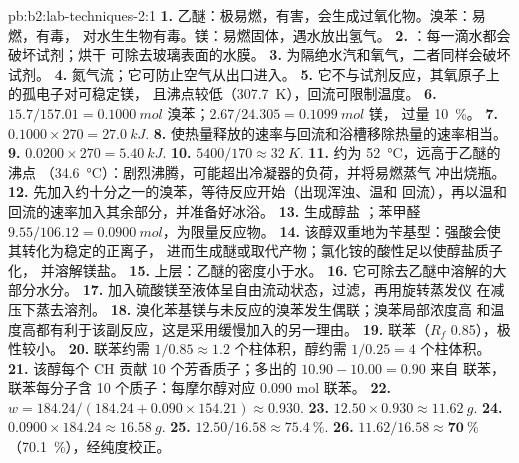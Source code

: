 \begin{solution}{pb:b2:lab-techniques-2:1}
\textbf{1.} 乙醚：极易燃，有害，会生成过氧化物。溴苯：易燃，有毒，
对水生生物有毒。镁：易燃固体，遇水放出氢气。
\textbf{2.} ：每一滴水都会破坏试剂；烘干
可除去玻璃表面的水膜。
\textbf{3.} 为隔绝水汽和氧气，二者同样会破坏试剂。
\textbf{4.} 氮气流；它可防止空气从出口进入。
\textbf{5.} 它不与试剂反应，其氧原子上的孤电子对可稳定镁，
且沸点较低（\qty{307.7}{K}），回流可限制温度。
\textbf{6.} $15.7/157.01 = \qty{0.1000}{mol}$ 溴苯；$2.67/24.305 = \qty{0.1099}{mol}$ 镁，
过量 10~\%。
\textbf{7.} $0.1000 \times 270 = \qty{27.0}{kJ}$.
\textbf{8.} 使热量释放的速率与回流和浴槽移除热量的速率相当。
\textbf{9.} $0.0200 \times 270 = \qty{5.40}{kJ}$.
\textbf{10.} $5400/170 \approx \qty{32}{K}$.
\textbf{11.} 约为 \qty{52}{\degreeCelsius}，远高于乙醚的沸点
（\qty{34.6}{\degreeCelsius}）：剧烈沸腾，可能超出冷凝器的负荷，并将易燃蒸气
冲出烧瓶。
\textbf{12.} 先加入约十分之一的溴苯，等待反应开始（出现浑浊、温和
回流），再以温和回流的速率加入其余部分，并准备好冰浴。
\textbf{13.}  生成醇盐 ；苯甲醛
$9.55/106.12 = \qty{0.0900}{mol}$，为限量反应物。
\textbf{14.} 该醇双重地为苄基型：强酸会使其转化为稳定的正离子，
进而生成醚或取代产物；氯化铵的酸性足以使醇盐质子化，
并溶解镁盐。
\textbf{15.} 上层：乙醚的密度小于水。
\textbf{16.} 它可除去乙醚中溶解的大部分水分。
\textbf{17.} 加入硫酸镁至液体呈自由流动状态，过滤，再用旋转蒸发仪
在减压下蒸去溶剂。
\textbf{18.} 溴化苯基镁与未反应的溴苯发生偶联；溴苯局部浓度高
和温度高都有利于该副反应，这是采用缓慢加入的另一理由。
\textbf{19.} 联苯（$R_f$ 0.85），极性较小。
\textbf{20.} 联苯约需 $1/0.85 \approx 1.2$ 个柱体积，醇约需 $1/0.25 = 4$ 个柱体积。
\textbf{21.} 该醇每个 CH 贡献 10 个芳香质子；多出的 $10.90 - 10.00 = 0.90$ 来自
联苯，联苯每分子含 10 个质子：每摩尔醇对应 0.090 mol 联苯。
\textbf{22.} $w = 184.24/(184.24 + 0.090 \times 154.21) \approx 0.930$.
\textbf{23.} $12.50 \times 0.930 \approx \qty{11.62}{g}$.
\textbf{24.} $0.0900 \times 184.24 \approx \qty{16.58}{g}$.
\textbf{25.} $12.50/16.58 \approx 75.4~\%$.
\textbf{26.} $11.62/16.58 \approx \boldsymbol{70~\%}$（70.1~\%），经纯度校正。
\end{solution}
